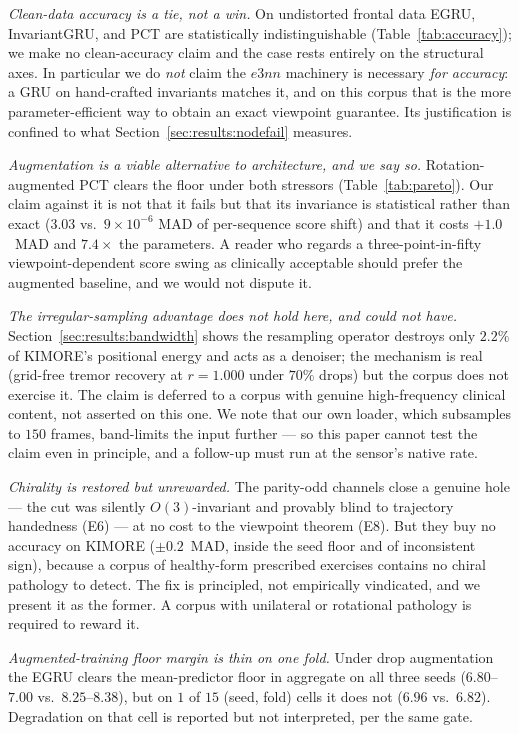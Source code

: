 \documentclass[10pt,journal]{IEEEtran}
\begin{document}
\emph{Clean-data accuracy is a tie, not a win.} On undistorted frontal data EGRU, InvariantGRU, and
PCT are statistically indistinguishable (Table~\ref{tab:accuracy}); we make no clean-accuracy claim
and the case rests entirely on the structural axes. In particular we do \emph{not} claim the $e3nn$
machinery is necessary \emph{for accuracy}: a GRU on hand-crafted invariants matches it, and on this
corpus that is the more parameter-efficient way to obtain an exact viewpoint guarantee. Its
justification is confined to what Section~\ref{sec:results:nodefail} measures.

\emph{Augmentation is a viable alternative to architecture, and we say so.} Rotation-augmented PCT
clears the floor under both stressors (Table~\ref{tab:pareto}). Our claim against it is not that it
fails but that its invariance is statistical rather than exact ($3.03$ vs.\ $9\times10^{-6}$ MAD of
per-sequence score shift) and that it costs $+1.0$~MAD and $7.4\times$ the parameters. A reader who
regards a three-point-in-fifty viewpoint-dependent score swing as clinically acceptable should prefer
the augmented baseline, and we would not dispute it.

\emph{The irregular-sampling advantage does not hold here, and could not have.}
Section~\ref{sec:results:bandwidth} shows the resampling operator destroys only $2.2\%$ of KIMORE's
positional energy and acts as a denoiser; the mechanism is real (grid-free tremor recovery at
$r=1.000$ under $70\%$ drops) but the corpus does not exercise it. The claim is deferred to a corpus
with genuine high-frequency clinical content, not asserted on this one. We note that our own loader,
which subsamples to $150$ frames, band-limits the input further --- so this paper cannot test the
claim even in principle, and a follow-up must run at the sensor's native rate.

\emph{Chirality is restored but unrewarded.} The parity-odd channels close a genuine hole --- the cut
was silently $O(3)$-invariant and provably blind to trajectory handedness (E6) --- at no cost to the
viewpoint theorem (E8). But they buy no accuracy on KIMORE ($\pm0.2$~MAD, inside the seed floor and of
inconsistent sign), because a corpus of healthy-form prescribed exercises contains no chiral
pathology to detect. The fix is principled, not empirically vindicated, and we present it as the
former. A corpus with unilateral or rotational pathology is required to reward it.

\emph{Augmented-training floor margin is thin on one fold.} Under drop augmentation the EGRU clears
the mean-predictor floor in aggregate on all three seeds ($6.80$--$7.00$ vs.\ $8.25$--$8.38$), but
on $1$ of $15$ (seed, fold) cells it does not ($6.96$ vs.\ $6.82$). Degradation on that cell is
reported but not interpreted, per the same gate.
\end{document}
